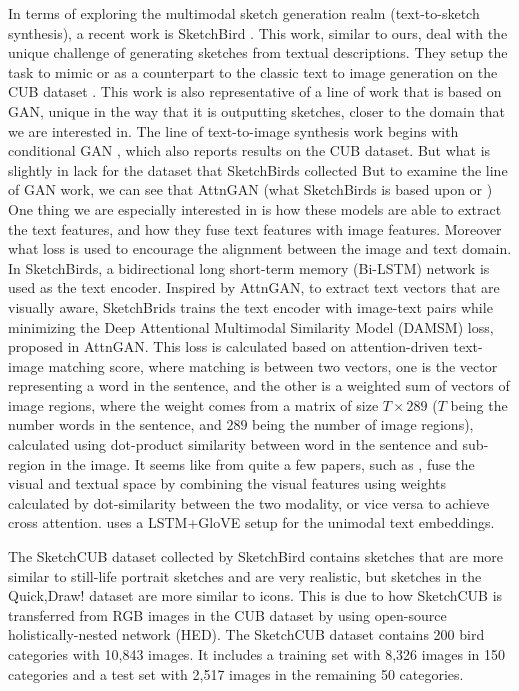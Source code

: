 In terms of exploring the multimodal sketch generation realm (text-to-sketch synthesis), a recent work is SketchBird \citep{sketchbirds}. This work, similar to ours, deal with the unique challenge of generating sketches from textual descriptions. They setup the task to mimic or as a counterpart to the classic text to image generation on the CUB dataset \citep{WahCUB_200_2011}. 
This work is also representative of a line of work that is based on GAN, unique in the way that it is outputting sketches, closer to the domain that we are interested in.
The line of text-to-image synthesis work begins with conditional GAN \citep{cGAN_text_image}, which also reports results on the CUB dataset. But what is slightly in lack for the dataset that SketchBirds collected  
But to examine the line of GAN work, we can see that AttnGAN \citep{attngan_paper} (what SketchBirds is based upon or ) 
One thing we are especially interested in is how these models are able to extract the text features, and how they fuse text features with image features. Moreover what loss is used to encourage the alignment between the image and text domain. 
In SketchBirds, a bidirectional long short-term memory (Bi-LSTM) network is used as the text encoder. Inspired by AttnGAN, to extract text vectors that are visually aware, SketchBrids trains the text encoder with image-text pairs while minimizing the Deep Attentional Multimodal Similarity Model (DAMSM) loss, proposed in AttnGAN. This loss is calculated based on attention-driven text-image matching score, where matching is between two vectors, one is the vector representing a word in the sentence, and the other is a weighted sum of vectors of image regions, where the weight comes from a matrix of size $T\times 289$ ($T$ being the number words in the sentence, and $289$ being the number of image regions), calculated using dot-product similarity between word in the sentence and sub-region in the image. 
It seems like from quite a few papers, such as \cite{joyce-chai-zscl}, fuse the visual and textual space by combining the visual features using weights calculated by dot-similarity between the two modality, or vice versa to achieve cross attention. \cite{joyce-chai-zscl} uses a LSTM+GloVE setup for the unimodal text embeddings.       

The SketchCUB dataset collected by SketchBird contains sketches that are more similar to still-life portrait sketches and are very realistic, but sketches in the Quick,Draw! dataset are more similar to icons. This is due to how SketchCUB is transferred from RGB images in the CUB dataset by using open-source holistically-nested network (HED). The SketchCUB dataset contains
200 bird categories with 10,843 images. It includes a training set with 8,326 images in 150 categories and a test set with 2,517 images in the remaining 50 categories.  

